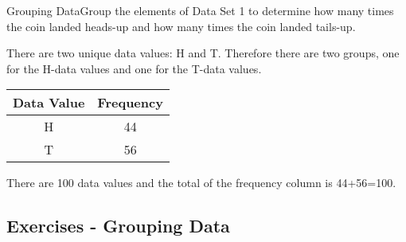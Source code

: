 \documentclass[10pt,a4paper,titlepage,twoside,openright]{report}
\begin{document}
\begin{wex}{Grouping Data}{Group the elements of Data Set 1 to determine how many times the coin landed heads-up and how many times the coin landed tails-up.}{
There are two unique data values: H and T. Therefore there are two groups, one for the H-data values and one for the T-data values.


\begin{center}
\begin{tabular}{|c|c|}\hline
Data Value & Frequency \\\hline\hline
H& 44\\\hline
T& 56\\\hline
\end{tabular}
\end{center}

There are 100 data values and the total of the frequency column is 44+56=100.}
\end{wex}

\subsection{Exercises - Grouping Data}
\end{document}
